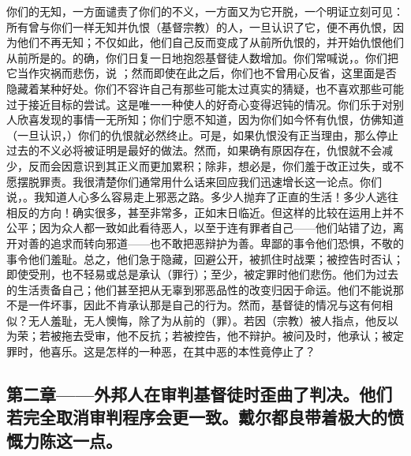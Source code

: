 你们的无知，一方面谴责了你们的不义，一方面又为它开脱，一个明证立刻可见：所有曾与你们一样无知并仇恨（基督宗教）的人，一旦认识了它，便不再仇恨，因为他们不再无知；不仅如此，他们自己反而变成了从前所仇恨的，并开始仇恨他们从前所是的。的确，你们日复一日地抱怨基督徒人数增加。你们常喊说，。你们把它当作灾祸而悲伤，说 ；然而即使在此之后，你们也不曾用心反省，这里面是否隐藏着某种好处。你们不容许自己有那些可能太过真实的猜疑，也不喜欢那些可能过于接近目标的尝试。这是唯一一种使人的好奇心变得迟钝的情况。你们乐于对别人欣喜发现的事情一无所知；你们宁愿不知道，因为你们如今怀有仇恨，仿佛知道（一旦认识，）你们的仇恨就必然终止。可是，如果仇恨没有正当理由，那么停止过去的不义必将被证明是最好的做法。然而，如果确有原因存在，仇恨就不会减少，反而会因意识到其正义而更加累积；除非，想必是，你们羞于改正过失，或不愿摆脱罪责。我很清楚你们通常用什么话来回应我们迅速增长这一论点。你们说，。我知道人心多么容易走上邪恶之路。多少人抛弃了正直的生活！多少人逃往相反的方向！确实很多，甚至非常多，正如末日临近。但这样的比较在运用上并不公平；因为众人都一致如此看待恶人，以至于连有罪者自己——他们站错了边，离开对善的追求而转向邪道——也不敢把恶辩护为善。卑鄙的事令他们恐惧，不敬的事令他们羞耻。总之，他们急于隐藏，回避公开，被抓住时战栗；被控告时否认；即使受刑，也不轻易或总是承认（罪行）；至少，被定罪时他们悲伤。他们为过去的生活责备自己；他们甚至把从无辜到邪恶品性的改变归因于命运。他们不能说那不是一件坏事，因此不肯承认那是自己的行为。然而，基督徒的情况与这有何相似？无人羞耻，无人懊悔，除了为从前的（罪）。若因（宗教）被人指点，他反以为荣；若被拖去受审，他不反抗；若被控告，他不辩护。被问及时，他承认；被定罪时，他喜乐。这是怎样的一种恶，在其中恶的本性竟停止了？\par


\subsection{第二章——外邦人在审判基督徒时歪曲了判决。他们若完全取消审判程序会更一致。戴尔都良带着极大的愤慨力陈这一点。}

